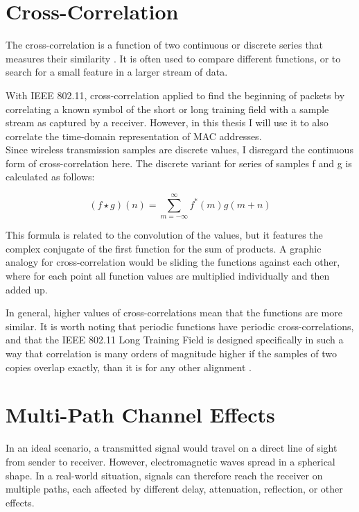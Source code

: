 
\section{Cross-Correlation}

The cross-correlation is a function of two continuous or discrete series that measures their similarity \cite{NEEDED}. It is often used to compare different functions, or to search for a small feature in a larger stream of data.

With IEEE 802.11, cross-correlation applied to find the beginning of packets by correlating a known symbol of the short or long training field with a sample stream as captured by a receiver. However, in this thesis I will use it to also correlate the time-domain representation of MAC addresses.\\

Since wireless transmission samples are discrete values, I disregard the continuous form of cross-correlation here. The discrete variant for series of samples f and g is calculated as follows:

$$ (f \star g)(n) = \sum_{m=-\infty}^{\infty} f^{\ast}(m) g(m+n) $$\vspace{0cm}

This formula is related to the convolution of the values, but it features the complex conjugate of the first function for the sum of products. A graphic analogy for cross-correlation would be sliding the functions against each other, where for each point all function values are multiplied individually and then added up.

In general, higher values of cross-correlations mean that the functions are more similar. It is worth noting that periodic functions have periodic cross-correlations, and that the IEEE 802.11 Long Training Field is designed specifically in such a way that correlation is many orders of magnitude higher if the samples of two copies overlap exactly, than it is for any other alignment \cite{perahia2013}.



\section{Multi-Path Channel Effects}\label{sec:multipath}

In an ideal scenario, a transmitted signal would travel on a direct line of sight from sender to receiver. However, electromagnetic waves spread in a spherical shape. In a real-world situation, signals can therefore reach the receiver on multiple paths, each affected by different delay, attenuation, reflection, or other effects.


